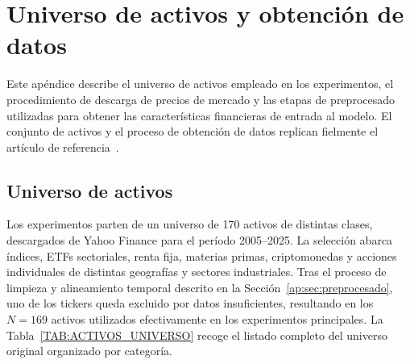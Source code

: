 \chapter{Universo de activos y obtención de datos}
\label{ap:datos}

Este apéndice describe el universo de activos empleado en los experimentos, el procedimiento de descarga de precios de mercado y las etapas de preprocesado utilizadas para obtener las características financieras de entrada al modelo. El conjunto de activos y el proceso de obtención de datos replican fielmente el artículo de referencia~\cite{arian2025qhrp}.

\section{Universo de activos}
\label{ap:sec:universo_activos}

Los experimentos parten de un universo de 170 activos de distintas clases, descargados de Yahoo Finance para el período 2005--2025. La selección abarca índices, ETFs sectoriales, renta fija, materias primas, criptomonedas y acciones individuales de distintas geografías y sectores industriales. Tras el proceso de limpieza y alineamiento temporal descrito en la Sección~\ref{ap:sec:preprocesado}, uno de los tickers queda excluido por datos insuficientes, resultando en los $N=169$ activos utilizados efectivamente en los experimentos principales. La Tabla~\ref{TAB:ACTIVOS_UNIVERSO} recoge el listado completo del universo original organizado por categoría.

